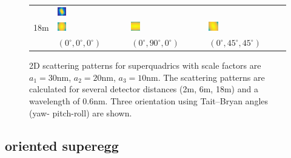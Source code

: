 \begin{figure}[thb]
{\begin{tabular}{llll}
     & \includegraphics[width=0.13\textwidth]{../images/form_factor/supershapes/superquadrics_2_5_0_45_45_6m.png}  \\
18m  & \includegraphics[width=0.13\textwidth]{../images/form_factor/supershapes/superquadrics_2_5_0_0_0_18m.png}
     & \includegraphics[width=0.13\textwidth]{../images/form_factor/supershapes/superquadrics_2_5_0_90_0_18m.png}
     & \includegraphics[width=0.13\textwidth]{../images/form_factor/supershapes/superquadrics_2_5_0_45_45_18m.png}  \\
     & {\small $(0^\circ,0^\circ,0^\circ)$}
     & {\small $(0^\circ,90^\circ,0^\circ)$}
     & {\small $(0^\circ,45^\circ,45^\circ)$}  %
\end{tabular}
}
\endgroup
  \caption{2D scattering patterns for superquadrics with scale factors are $a_1=30$nm, $a_2=20$nm, $a_3=10$nm. The scattering patterns are calculated for several detector distances (2m, 6m, 18m) and a wavelength of 0.6nm. Three orientation using Tait–Bryan angles (yaw-
pitch-roll) are shown.} \label{fig:superquadricsIQ2D}
\end{figure}

\subsection{oriented superegg} ~\\

